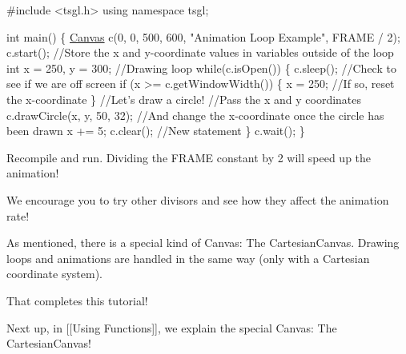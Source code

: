 \begin{DoxyCode}
\textcolor{preprocessor}{#include <tsgl.h>}
\textcolor{keyword}{using namespace }tsgl;

\textcolor{keywordtype}{int} main() \{
  \hyperlink{classtsgl_1_1_canvas}{Canvas} c(0, 0, 500, 600, \textcolor{stringliteral}{"Animation Loop Example"}, FRAME / 2);
  c.start();
  \textcolor{comment}{//Store the x and y-coordinate values in variables outside of the loop}
  \textcolor{keywordtype}{int} x = 250, y = 300;
  \textcolor{comment}{//Drawing loop}
  \textcolor{keywordflow}{while}(c.isOpen()) \{
    c.sleep();
    \textcolor{comment}{//Check to see if we are off screen}
    \textcolor{keywordflow}{if} (x >= c.getWindowWidth()) \{
       x = 250; \textcolor{comment}{//If so, reset the x-coordinate}
    \}
    \textcolor{comment}{//Let's draw a circle!}
    \textcolor{comment}{//Pass the x and y coordinates}
    c.drawCircle(x, y, 50, 32);
    \textcolor{comment}{//And change the x-coordinate once the circle has been drawn}
    x += 5;
    c.clear(); \textcolor{comment}{//New statement}
  \}
  c.wait();
\}
\end{DoxyCode}


Recompile and run. Dividing the {\ttfamily F\-R\-A\-M\-E} constant by 2 will speed up the animation!

We encourage you to try other divisors and see how they affect the animation rate!

As mentioned, there is a special kind of Canvas\-: The Cartesian\-Canvas. Drawing loops and animations are handled in the same way (only with a Cartesian coordinate system).

That completes this tutorial!

Next up, in \mbox{[}\mbox{[}Using Functions\mbox{]}\mbox{]}, we explain the special Canvas\-: The Cartesian\-Canvas! 